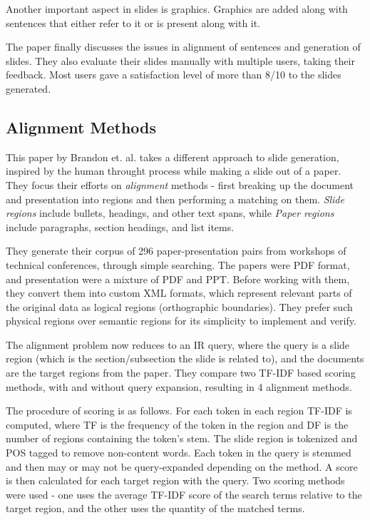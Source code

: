 \documentclass[10pt,twocolumn,letterpaper]{article}
\begin{document}
Another important aspect in slides is graphics. Graphics are added along with sentences 
that either refer to it or is present along with it.

The paper finally discusses the issues in alignment of sentences and generation of slides.
They also evaluate their slides manually with multiple users, taking their feedback.
Most users gave a satisfaction level of more than 8/10 to the slides generated.

\subsection{Alignment Methods}
This paper by Brandon et. al. \cite{brandon} takes a different approach to slide generation,
inspired by the human throught process while making a slide out of a paper.
They focus their efforts on \textit{alignment} methods - first breaking up the document and
presentation into regions and then performing a matching on them.
\textit{Slide regions} include bullets, headings, and other text spans, while \textit{Paper regions}
include paragraphs, section headings, and list items.

They generate their corpus of 296 paper-presentation pairs from workshops of technical conferences,
through simple searching. The papers were PDF format, and presentation were a mixture of PDF and PPT.
Before working with them, they convert them into custom XML formats, which represent relevant parts of
the original data as logical regions (orthographic boundaries). They prefer such physical regions over
semantic regions for its simplicity to implement and verify.

The alignment problem now reduces to an IR query, where the query is a slide region (which is the
section/subsection the slide is related to), and the documents are the target regions from the paper.
They compare two TF-IDF based scoring methods, with and without query expansion, resulting in 4
alignment methods.

The procedure of scoring is as follows. For each token in each region TF-IDF is computed, where TF is
the frequency of the token in the region and DF is the number of regions containing the token's stem.
The slide region is tokenized and POS tagged to remove non-content words. Each token in the query is
stemmed and then may or may not be query-expanded depending on the method. A score is then calculated
for each target region with the query. Two scoring methods were used - one uses the average TF-IDF
score of the search terms relative to the target region, and the other uses the quantity of the matched
terms.
\end{document}
